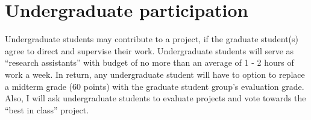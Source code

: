\documentclass[11pt,onecolumn]{article}
\begin{document}
\section*{Undergraduate participation}

Undergraduate students may contribute to a project, if the graduate student(s) agree to direct and supervise their work. Undergraduate students will serve as ``research assistants'' with budget of no more than an average of 1 - 2 hours of work a week. In return, any undergraduate student will have to option to replace a midterm grade (60 points) with the graduate student group's evaluation grade. Also, I will ask undergraduate students to evaluate projects and vote towards the ``best in class'' project.
\end{document}
